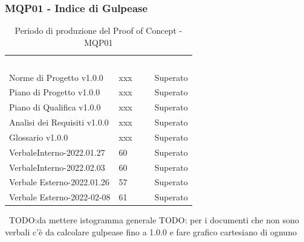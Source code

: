 \subsubsection{MQP01 - Indice di Gulpease}
\begin{table}[H]
        \renewcommand{\arraystretch}{1.5}
        \begin{tabular}{m{}<{\centering}  m{}<{\centering}  m{}<{\centering} }
            \rowcolor{darkblue}
            \textcolor{white}{\textbf{Documento}}& \textcolor{white}{\textbf{Valore}} & \textcolor{white}{\textbf{Esito}}\\ 

            Norme di Progetto v1.0.0 &
            xxx &
            Superato \\

            Piano di Progetto v1.0.0 &
            xxx &
            Superato \\

            Piano di Qualifica v1.0.0 &
            xxx &
            Superato \\

            Analisi dei Requisiti v1.0.0 &
            xxx &
            Superato \\
            
            Glossario v1.0.0 &
            xxx &
            Superato \\

            VerbaleInterno-2022.01.27&
            60 &
            Superato \\
            
            VerbaleInterno-2022.02.03&
            60 &
            Superato \\

            Verbale Esterno-2022.01.26&
            57&
            Superato \\

            Verbale Esterno-2022-02-08&
            61&
            Superato \\
    \end{tabular}
    \caption{Periodo di produzione del Proof of Concept - MQP01}\
	TODO:da mettere istogramma generale
	TODO: per i documenti che non sono verbali c'è da calcolare gulpease fino a 1.0.0 e fare grafico cartesiano di ognuno
\end{table}
